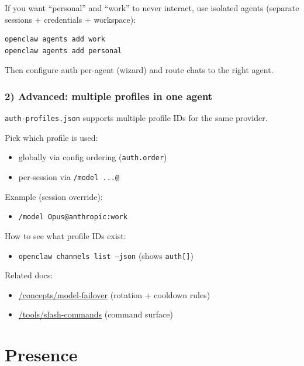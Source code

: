 If you want “personal” and “work” to never interact, use isolated agents (separate sessions + credentials + workspace):

\begin{lstlisting}[language=bash]
openclaw agents add work
openclaw agents add personal
\end{lstlisting}


Then configure auth per-agent (wizard) and route chats to the right agent.

\subsubsection{2) Advanced: multiple profiles in one agent}


\texttt{auth-profiles.json} supports multiple profile IDs for the same provider.

Pick which profile is used:

\begin{itemize}
  \item globally via config ordering (\texttt{auth.order})
  \item per-session via \texttt{/model ...@}
\end{itemize}


Example (session override):

\begin{itemize}
  \item \texttt{/model Opus@anthropic:work}
\end{itemize}


How to see what profile IDs exist:

\begin{itemize}
  \item \texttt{openclaw channels list --json} (shows \texttt{auth[]})
\end{itemize}


Related docs:

\begin{itemize}
  \item \href{/concepts/model-failover}{/concepts/model-failover} (rotation + cooldown rules)
  \item \href{/tools/slash-commands}{/tools/slash-commands} (command surface)
\end{itemize}



\clearpage

\section{Presence}


